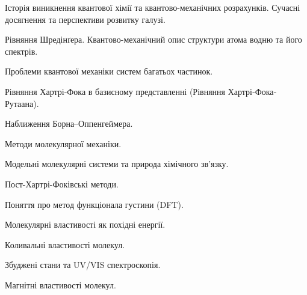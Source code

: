 \documentclass{Syllabus}
\begin{document}
\begin{Rozdil}
 \label{R:predmet}
    \begin{Rozdil}
        \item Історія виникнення квантової хімії та квантово-механічних розрахунків. Сучасні досягнення та перспективи розвитку галузі.
        \item Рівняння Шредінґера. Квантово-механічний опис структури атома водню та його спектрів.
    \end{Rozdil}
 \label{R:abinitio}
    \begin{Rozdil}
        \item Проблеми квантової механіки систем багатьох частинок.
        \item Рівняння Хартрі‐Фока в базисному представленні (Рівняння Хартрі‐Фока‐Рутаана).
        \item Наближення Борна–Оппенгеймера.
        \item  Методи молекулярної механіки.
        \item Модельні молекулярні системи та природа хімічного зв’язку.
        \item Пост-Хартрі-Фоківські методи.
        \item Поняття про метод функціонала густини (DFT).
    \end{Rozdil}
  \label{R:vlastyv}
    \begin{Rozdil}
        \item Молекулярні властивості як похідні енергії.
        \item Коливальні властивості молекул.
        \item Збуджені стани та UV/VIS спектроскопія.
        \item Магнітні властивості молекул.
    \end{Rozdil}

\end{Rozdil}

%
\end{document}
